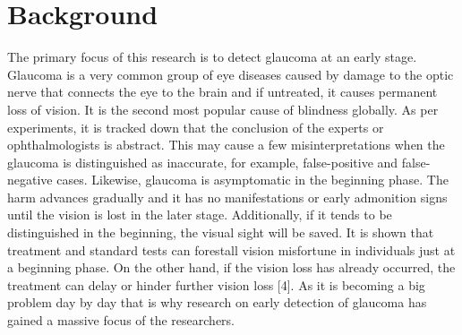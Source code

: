 \documentclass[conference]{IEEEtran}
\begin{document}
\section{Background}

The primary focus of this research is to detect glaucoma at an early stage. Glaucoma is a very common group of eye diseases caused by damage to the optic nerve that connects the eye to the brain and if untreated, it causes permanent loss of vision. It is the second most popular cause of blindness globally. As per experiments, it is tracked down that the conclusion of the experts or ophthalmologists is abstract. This may cause a few misinterpretations when the glaucoma is distinguished as inaccurate, for example, false-positive and false-negative cases. Likewise, glaucoma is asymptomatic in the beginning phase. The harm advances gradually and it has no manifestations or early admonition signs until the vision is lost in the later stage. Additionally, if it tends to be distinguished in the beginning, the visual sight will be saved. It is shown that treatment and standard tests can forestall vision misfortune in individuals just at a beginning phase. On the other hand, if the vision loss has already occurred, the treatment can delay or hinder further vision loss [4]. As it is becoming a big problem day by day that is why research on early detection of glaucoma has gained a massive focus of  the researchers. 
\end{document}
